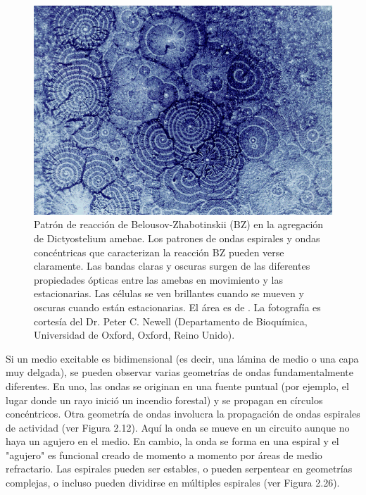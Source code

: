 \begin{figure}[ht]
	\centering\includegraphics[width=\imsize]{hongo.png}
	\caption[Diagrama que muestra el patrón creado por el \gls{AC} regla 30, con celdas coloreadas según el estado anterior de su vecindad. ]{Patrón de reacción de Belousov-Zhabotinskii (BZ) en la agregación de Dictyostelium amebae. Los patrones de ondas espirales y ondas concéntricas que caracterizan la reacción BZ pueden verse claramente. Las bandas claras y oscuras surgen de las diferentes propiedades ópticas entre las amebas en movimiento y las estacionarias. Las células se ven brillantes cuando se mueven y oscuras cuando están estacionarias. El área es de . La fotografía es cortesía del Dr. Peter C. Newell (Departamento de Bioquímica, Universidad de Oxford, Oxford, Reino Unido).} 	\label{fig:hongo}
\end{figure}


Si un medio excitable es bidimensional (es decir, una lámina de medio o una capa muy delgada), se pueden observar varias geometrías de ondas fundamentalmente diferentes.  En uno, las ondas se originan en una fuente puntual (por ejemplo, el lugar donde un rayo inició un incendio forestal) y se propagan en círculos concéntricos.  Otra geometría de ondas involucra la propagación de ondas espirales de actividad (ver Figura 2.12). Aquí la onda se mueve en un circuito aunque no haya un agujero en el medio. En cambio, la onda se forma en una espiral y el "agujero" es funcional creado de momento a momento por áreas de medio refractario. Las espirales pueden ser estables, o pueden serpentear en geometrías complejas, o incluso pueden dividirse en múltiples espirales (ver Figura 2.26).


